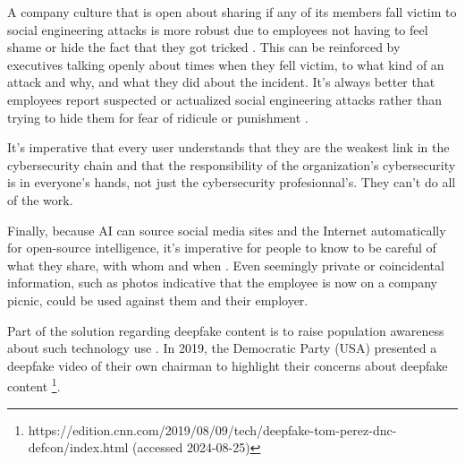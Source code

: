 A company culture that is open about sharing if any of its members fall victim to social engineering attacks is more robust due to employees not having to feel shame or hide the fact that they got tricked \citep{hadnagySocialEngineering2018}. This can be reinforced by executives talking openly about times when they fell victim, to what kind of an attack and why, and what they did about the incident. It's always better that employees report suspected or actualized social engineering attacks rather than trying to hide them for fear of ridicule or punishment \citep{mitnickArtDeceptionControlling2003}.

It's imperative that every user understands that they are the weakest link in the cybersecurity chain \citep{mitnickArtDeceptionControlling2003} and that the responsibility of the organization's cybersecurity is in everyone's hands, not just the cybersecurity profesionnal's. They can't do all of the work.


Finally, because AI can source social media sites and the Internet automatically for open-source intelligence, it's imperative for people to know to be careful of what they share, with whom and when \citep{mitnickArtDeceptionControlling2003}. Even seemingly private or coincidental information, such as photos indicative that the employee is now on a company picnic, could be used against them and their employer.

Part of the solution regarding deepfake content is to raise population awareness about such technology use \citep{blauthArtificialIntelligenceCrime2022}. In 2019, the Democratic Party (USA) presented a deepfake video of their own chairman to highlight their concerns about deepfake content \footnote{https://edition.cnn.com/2019/08/09/tech/deepfake-tom-perez-dnc-defcon/index.html (accessed 2024-08-25)}.